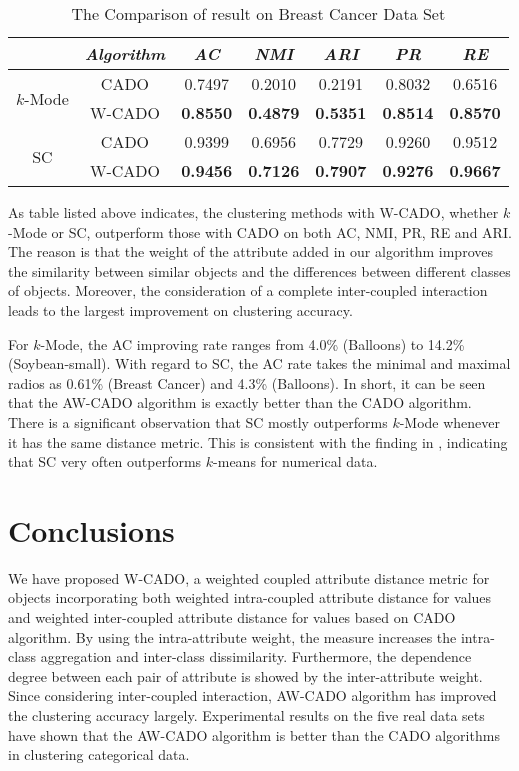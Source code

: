 \documentclass[review]{elsarticle}
\begin{document}
\begin{table}[!h]\tabcolsep=0.065in
\centering
\caption{The Comparison of result on Breast Cancer Data Set}
\small
\label{tab:The Clustering Results Comparison on Breast Cancer Data Set}
\begin{tabular}{ccccccc}
\hline
\emph{}&\emph{Algorithm}&\emph{AC}&\emph{NMI}&\emph{ARI}&\emph{PR}&\emph{RE} \\
\hline
\multirow{2}{*}{$k$-Mode} & CADO & 0.7497 & 0.2010 & 0.2191 & 0.8032 & 0.6516\\
    & W-CADO & \textbf{0.8550} & \textbf{0.4879} & \textbf{0.5351} & \textbf{0.8514} & \textbf{0.8570}\\
    \hline
\multirow{2}{*}{SC} & CADO & 0.9399 & 0.6956 & 0.7729 & 0.9260 & 0.9512\\
    & W-CADO & \textbf{0.9456} & \textbf{0.7126} & \textbf{0.7907} & \textbf{0.9276} & \textbf{0.9667}\\
\hline
\end{tabular}
\end{table}

 As table listed above indicates, the clustering methods with W-CADO, whether $k$-Mode or SC, outperform those with CADO on both AC, NMI, PR, RE and ARI. The reason is that the weight of the attribute added in our algorithm improves the similarity between similar objects and the differences between different classes of objects. Moreover, the consideration of a complete inter-coupled interaction leads to the largest improvement on clustering accuracy.

 For $k$-Mode, the AC improving rate ranges from 4.0\% (Balloons) to 14.2\% (Soybean-small). With regard to SC, the AC rate takes the minimal and maximal radios as 0.61\% (Breast Cancer) and 4.3\% (Balloons). In short, it can be seen that the AW-CADO algorithm is exactly better than the CADO algorithm. There is a significant observation that SC mostly outperforms $k$-Mode whenever it has the same distance metric. This is consistent with the finding in \cite{Luxburg2007A}, indicating that SC very often outperforms $k$-means for numerical data.

\section{Conclusions}
We have proposed W-CADO, a weighted coupled attribute distance metric for objects incorporating both weighted intra-coupled attribute distance for values and weighted inter-coupled attribute distance for values based on CADO algorithm. By using the intra-attribute weight, the measure increases the intra-class aggregation and inter-class dissimilarity. Furthermore, the dependence degree between each pair of attribute is showed by the inter-attribute weight. Since considering inter-coupled interaction, AW-CADO algorithm has improved the clustering accuracy largely. Experimental results on the five real data sets have shown that the AW-CADO algorithm is better than the CADO algorithms in clustering categorical data.
\end{document}
